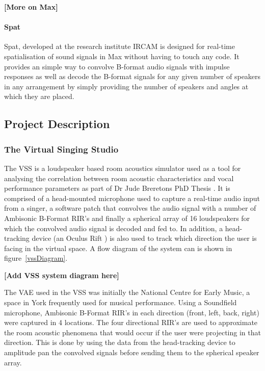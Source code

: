 \documentclass[../../main.tex]{subfiles}
\begin{document}
		\begin{center}
			\textbf{[More on Max]}
		\end{center}

		\paragraph{Spat}

			 Spat, developed at the research institute IRCAM \cite{spat} is designed for real-time spatialisation of sound signals in Max without having to touch any code. It provides an simple way to convolve B-format audio signals with impulse responses as well as decode the B-format signals for any given number of speakers in any arrangement by simply providing the number of speakers and angles at which they are placed.

\subsection{Project Description}
	\subsubsection{The Virtual Singing Studio}

		The \ac{VSS} is a loudspeaker based room acoustics simulator used as a tool for analysing the correlation between room acoustic characteristics and vocal performance parameters as part of Dr Jude Breretons PhD Thesis \cite{Brereton2014}. It is comprised of a head-mounted microphone used to capture a real-time audio input from a singer, a software patch that convolves the audio signal with a number of Ambisonic B-Format \ac{RIR}'s and finally a spherical array of 16 loudspeakers for which the convolved audio signal is decoded and fed to. In addition, a head-tracking device (an Oculus Rift \cite{oculus}) is also used to track which direction the user is facing in the virtual space. A flow diagram of the system can is shown in figure~\ref{vssDiagram}.

		\begin{center}
			\textbf{[Add VSS system diagram here]}
		\end{center}

		The \ac{VAE} used in the \ac{VSS} was initially the National Centre for Early Music, a space in York frequently used for musical performance. Using a Soundfield microphone, Ambisonic B-Format \ac{RIR}'s in each direction (front, left, back, right) were captured in 4 locations. The four directional \ac{RIR}'s are used to approximate the room acoustic phenomena that would occur if the user were projecting in that direction. This is done by using the data from the head-tracking device to amplitude pan the convolved signals before sending them to the spherical speaker array.
\end{document}
